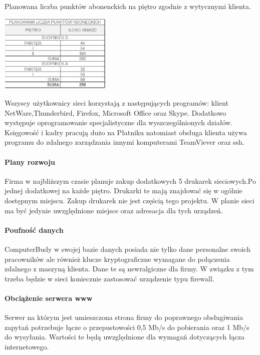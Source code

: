 \documentclass{report}
\begin{document}
\begin{table}[H]

\centering
\caption{Planowana liczba punktów abonenckich na piętro zgodnie z wytycznymi klienta. \label{tab:gnizado na pietro}}

\includegraphics[width=0.4\textwidth]{./obrazki/plany_wew/gniazda_na_pietro.png} 
 
\end{table}


Wszyscy użytkownicy sieci korzystają z następujących programów: klient NetWare,Thunderbird, Firefox, Microsoft Office oraz Skype. Dodatkowo występuje 
oprogramowanie specjalistyczne dla wyszczególnionych działów. Księgowość i kadry pracują dużo na Płatniku natomiast obsługa klienta używa programu
do zdalnego zarządzania innymi komputerami TeamViever oraz ssh.

\paragraph{Plany rozwoju}Firma w najbliższym czasie planuje zakup dodatkowych 5 drukarek sieciowych.Po jednej dodatkowej na każde piętro. Drukarki te mają znajdować się
w ogólnie dostępnym miejscu. Zakup drukarek nie jest częścią tego projektu. W planie sieci ma być jedynie uwzględnione miejsce oraz adresacja dla tych urządzeń.

\paragraph{Poufność danych}ComputerBudy w swojej bazie danych posiada nie tylko dane personalne swoich pracowników ale również klucze kryptograficzne wymagane do połączenia zdalnego
z maszyną klienta. Dane te są newralgiczne dla firmy. W związku z tym trzeba będzie w sieci koniecznie zastosować urządzenie typu firewall.

\paragraph{Obciążenie serwera www}Serwer na którym jest umieszczona strona firmy do poprawnego obsługiwania zapytań potrzebuje łącze o przepustowości 0,5 Mb/s do pobierania oraz
1 Mb/s do wysyłania. Wartości te będą uwzględnione dla wymagań dotyczących łącza internetowego.
\end{document}
